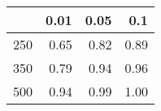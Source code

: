 % 
\begin{tabular}{rrrr}
  \hline
 & 0.01 & 0.05 & 0.1 \\ 
  \hline
250 & 0.65 & 0.82 & 0.89 \\ 
  350 & 0.79 & 0.94 & 0.96 \\ 
  500 & 0.94 & 0.99 & 1.00 \\ 
   \hline
\end{tabular}
